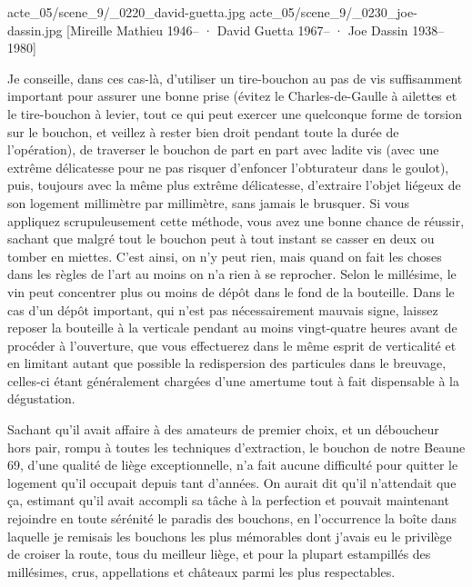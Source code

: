 %
%
%
{acte_05/scene_9/_0220_david-guetta.jpg}
{acte_05/scene_9/_0230_joe-dassin.jpg}
[Mireille Mathieu \textup{1946--} · David Guetta \textup{1967--} · Joe Dassin \textup{1938--1980}]

Je conseille, dans ces cas-là, d’utiliser un tire-bouchon au pas de vis suffisamment important pour assurer une bonne prise (évitez le Charles-de-Gaulle à ailettes et le tire-bouchon à levier, tout ce qui peut exercer une quelconque forme de torsion sur le bouchon, et veillez à rester bien droit pendant toute la durée de l’opération), de traverser le bouchon de part en part avec ladite vis (avec une extrême délicatesse pour ne pas risquer d’enfoncer l’obturateur dans le goulot), puis, toujours avec la même plus extrême délicatesse, d’extraire l’objet liégeux de son logement millimètre par millimètre, sans jamais le brusquer. Si vous appliquez scrupuleusement cette méthode, vous avez une bonne chance de réussir, sachant que malgré tout le bouchon peut à tout instant se casser en deux ou tomber en miettes. C’est ainsi, on n’y peut rien, mais quand on fait les choses dans les règles de l’art au moins on n’a rien à se reprocher. Selon le millésime, le vin peut concentrer plus ou moins de dépôt dans le fond de la bouteille. Dans le cas d’un dépôt important, qui n’est pas nécessairement mauvais signe, laissez reposer la bouteille à la verticale pendant au moins vingt-quatre heures avant de procéder à l’ouverture, que vous effectuerez dans le même esprit de verticalité et en limitant autant que possible la redispersion des particules dans le breuvage, celles-ci étant généralement chargées d’une amertume tout à fait dispensable à la dégustation.

Sachant qu’il avait affaire à des amateurs de premier choix, et un déboucheur hors pair, rompu à toutes les techniques d’extraction, le bouchon de notre Beaune 69, d’une qualité de liège exceptionnelle, n’a fait aucune difficulté pour quitter le logement qu’il occupait depuis tant d’années. On aurait dit qu’il n’attendait que ça, estimant qu’il avait accompli sa tâche à la perfection et pouvait maintenant rejoindre en toute sérénité le paradis des bouchons, en l’occurrence la boîte dans laquelle je remisais les bouchons les plus mémorables dont j’avais eu le privilège de croiser la route, tous du meilleur liège, et pour la plupart estampillés des millésimes, crus, appellations et châteaux parmi les plus respectables.


